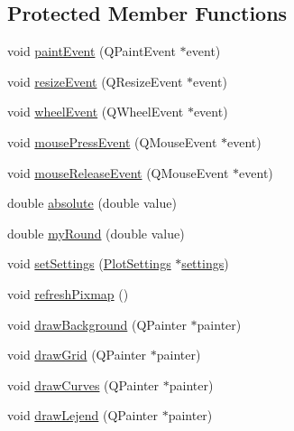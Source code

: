\subsection*{Protected Member Functions}
\begin{DoxyCompactItemize}
\item 
void \hyperlink{class_q_abstract_plotter_a87416d51109e91175149d34eb90dc187}{paint\+Event} (Q\+Paint\+Event $\ast$event)
\item 
void \hyperlink{class_q_abstract_plotter_a8eebfd5aae8766f9c61e42f46b5f7354}{resize\+Event} (Q\+Resize\+Event $\ast$event)
\item 
void \hyperlink{class_q_abstract_plotter_a1e89b6bb8696906192375b2b78ebcd7d}{wheel\+Event} (Q\+Wheel\+Event $\ast$event)
\item 
void \hyperlink{class_q_abstract_plotter_a55ad886929c2ade22c153d28ac3d88bc}{mouse\+Press\+Event} (Q\+Mouse\+Event $\ast$event)
\item 
void \hyperlink{class_q_abstract_plotter_a75f7427dc861c350b8651f1cc12725f6}{mouse\+Release\+Event} (Q\+Mouse\+Event $\ast$event)
\item 
double \hyperlink{class_q_abstract_plotter_a4daceb6767f904b0041110893a7fe34c}{absolute} (double value)
\item 
double \hyperlink{class_q_abstract_plotter_ad01fc79af8d23ab8f1e503348ce547db}{my\+Round} (double value)
\item 
void \hyperlink{class_q_abstract_plotter_abde5508291e80227be75fbf385c01fe1}{set\+Settings} (\hyperlink{class_plot_settings}{Plot\+Settings} $\ast$\hyperlink{class_q_abstract_plotter_af070c9bf7a0beb0100ccd84f1ace901d}{settings})
\item 
void \hyperlink{class_q_abstract_plotter_a75c7da532571dadf96d637088caa2c1e}{refresh\+Pixmap} ()
\item 
void \hyperlink{class_q_abstract_plotter_aab503d6b70444c13216d2ef4a0016810}{draw\+Background} (Q\+Painter $\ast$painter)
\item 
void \hyperlink{class_q_abstract_plotter_afa5a6bf2eb824b49aa2c3ab4095dcee1}{draw\+Grid} (Q\+Painter $\ast$painter)
\item 
void \hyperlink{class_q_abstract_plotter_a4651cab5c4c07f55f8292d692143169f}{draw\+Curves} (Q\+Painter $\ast$painter)
\item 
void \hyperlink{class_q_abstract_plotter_a73adb0b7a7f2717d5f82a8f4f7e699a1}{draw\+Lejend} (Q\+Painter $\ast$painter)
\end{DoxyCompactItemize}

